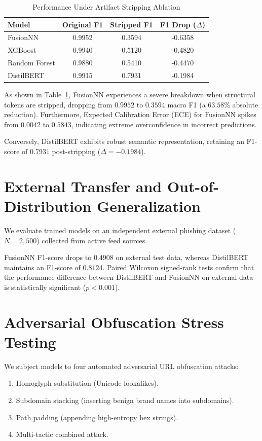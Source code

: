 \documentclass[conference,10pt]{IEEEtran}
\begin{document}
\begin{table}[htbp]
\caption{Performance Under Artifact Stripping Ablation}
\label{tab:stripping}
\centering
\begin{tabular}{lccc}
\toprule
\textbf{Model} & \textbf{Original F1} & \textbf{Stripped F1} & \textbf{F1 Drop ($\Delta$)} \\
\midrule
FusionNN & 0.9952 & 0.3594 & -0.6358 \\
XGBoost & 0.9940 & 0.5120 & -0.4820 \\
Random Forest & 0.9880 & 0.5410 & -0.4470 \\
DistilBERT & 0.9915 & 0.7931 & -0.1984 \\
\bottomrule
\end{tabular}
\end{table}

As shown in Table~\ref{tab:stripping}, FusionNN experiences a severe breakdown when structural tokens are stripped, dropping from $0.9952$ to $0.3594$ macro F1 (a $63.58\%$ absolute reduction). Furthermore, Expected Calibration Error (ECE) for FusionNN spikes from $0.0042$ to $0.5843$, indicating extreme overconfidence in incorrect predictions.

Conversely, DistilBERT exhibits robust semantic representation, retaining an F1-score of $0.7931$ post-stripping ($\Delta = -0.1984$).

\section{External Transfer and Out-of-Distribution Generalization}
We evaluate trained models on an independent external phishing dataset ($N=2,500$) collected from active feed sources. 

FusionNN F1-score drops to $0.4908$ on external test data, whereas DistilBERT maintains an F1-score of $0.8124$. Paired Wilcoxon signed-rank tests confirm that the performance difference between DistilBERT and FusionNN on external data is statistically significant ($p < 0.001$).

\section{Adversarial Obfuscation Stress Testing}
We subject models to four automated adversarial URL obfuscation attacks:
\begin{enumerate}
    \item Homoglyph substitution (Unicode lookalikes).
    \item Subdomain stacking (inserting benign brand names into subdomains).
    \item Path padding (appending high-entropy hex strings).
    \item Multi-tactic combined attack.
\end{enumerate}
\end{document}
